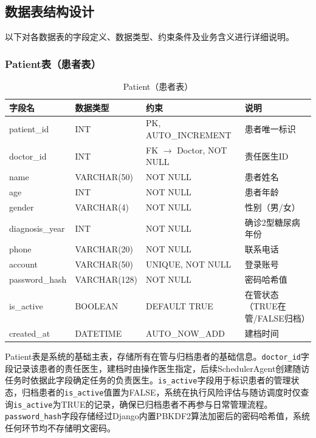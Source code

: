 \subsection{数据表结构设计}

以下对各数据表的字段定义、数据类型、约束条件及业务含义进行详细说明。

\subsubsection{Patient表（患者表）}

\begin{table}[H]
\centering
\caption{Patient（患者表）}
\label{tab:table-patient}
\begin{tabularx}{\textwidth}{|l|l|l|X|}
\hline
\textbf{字段名} & \textbf{数据类型} & \textbf{约束} & \textbf{说明} \\
\hline
patient\_id & INT & PK, AUTO\_INCREMENT & 患者唯一标识 \\
\hline
doctor\_id & INT & FK $\rightarrow$ Doctor, NOT NULL & 责任医生ID \\
\hline
name & VARCHAR(50) & NOT NULL & 患者姓名 \\
\hline
age & INT & NOT NULL & 患者年龄 \\
\hline
gender & VARCHAR(4) & NOT NULL & 性别（男/女） \\
\hline
diagnosis\_year & INT & NOT NULL & 确诊2型糖尿病年份 \\
\hline
phone & VARCHAR(20) & NOT NULL & 联系电话 \\
\hline
account & VARCHAR(50) & UNIQUE, NOT NULL & 登录账号 \\
\hline
password\_hash & VARCHAR(128) & NOT NULL & 密码哈希值 \\
\hline
is\_active & BOOLEAN & DEFAULT TRUE & 在管状态（TRUE在管/FALSE归档） \\
\hline
created\_at & DATETIME & AUTO\_NOW\_ADD & 建档时间 \\
\hline
\end{tabularx}
\end{table}

Patient表是系统的基础主表，存储所有在管与归档患者的基础信息。\texttt{doctor\_id}字段记录该患者的责任医生，建档时由操作医生指定，后续SchedulerAgent创建随访任务时依据此字段确定任务的负责医生。\texttt{is\_active}字段用于标识患者的管理状态，归档患者的\texttt{is\_active}值置为FALSE，系统在执行风险评估与随访调度时仅查询\texttt{is\_active}为TRUE的记录，确保已归档患者不再参与日常管理流程。\texttt{password\_hash}字段存储经过Django内置PBKDF2算法加密后的密码哈希值，系统任何环节均不存储明文密码。


